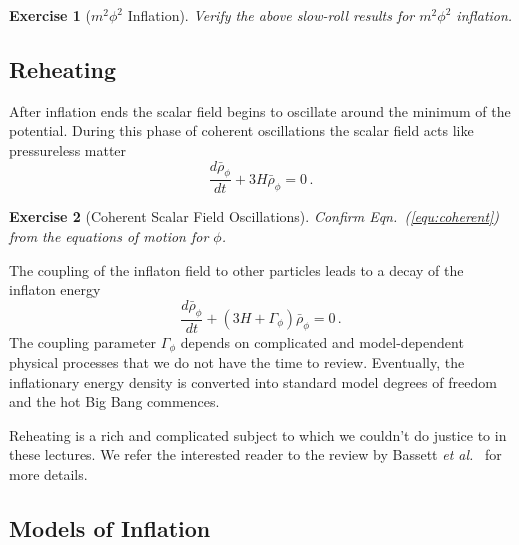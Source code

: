 \documentclass[12pt,letterpaper,rotate]{article}
\def\beq{\begin{equation}}
\def\eeq{\end{equation}}
\newtheorem{thm}{Exercise}
\begin{document}
{\begin{thm}[$m^2 \phi^2$ Inflation]
Verify the above slow-roll results for $m^2 \phi^2$ inflation.
\label{ex:chaotic}
\end{thm}

\subsection{Reheating}

After inflation ends the scalar field begins to oscillate around the minimum of the potential.
During this phase of coherent oscillations the scalar field acts like pressureless matter
\beq
\label{equ:coherent}
\frac{d \bar \rho_\phi}{dt} + 3H \bar \rho_\phi = 0\, .
\eeq

\begin{thm}[Coherent Scalar Field Oscillations]
Confirm Eqn.~(\ref{equ:coherent}) from the equations of motion for $\phi$.
\label{ex:coherent}
\end{thm}

The coupling of the inflaton field to other particles leads to a decay of the inflaton energy
\beq
\frac{d \bar \rho_\phi}{dt} +(3H+ \Gamma_\phi) \bar \rho_\phi = 0\, .
\eeq
The coupling parameter $\Gamma_\phi$ depends on complicated and model-dependent physical processes that we do not have the time to review.
Eventually, the inflationary energy density is converted into standard model degrees of freedom and the hot Big Bang commences.

Reheating is a rich and complicated subject to which we couldn't do justice to in these lectures.
We refer the interested reader to the review by Bassett {\it et al.}~\cite{BassettReview} for more details.




\subsection{Models of Inflation}

}
\end{document}
